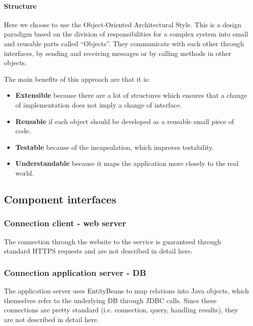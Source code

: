 \paragraph{Structure} Here we choose to use the Object-Oriented Architectural Style.
This is a design paradigm based on the division of responsibilities for a complex system
into small and reusable parts called ``Objects''.
They communicate with each other through interfaces, by sending and receiving messages
or by calling methods in other objects.

The main benefits of this approach are that it is:

\begin{itemize}
    \item{\textbf{Extensible} because there are a lot of structures which ensures that a change of implementation does not imply a change of interface.}
    \item{\textbf{Reusable} if each object should be developed as a reusable small piece of code.}
    \item{\textbf{Testable} because of the incapsulation, which improves testability.}
    \item{\textbf{Understandable} because it maps the application more closely to the real world.}
\end{itemize}

\subsection{Component interfaces}

\subsubsection{Connection client - web server} %
\label{ssub:https}
The connection through the website to the service is guaranteed through standard HTTPS requests and are not described in detail here.

\subsubsection{Connection application server - DB} %
\label{ssub:connection_application_server_db}
The application server uses EntityBeans to map relations into Java objects, which themselves refer to the underlying DB through JDBC calls. Since these connections are pretty standard (i.e. connection, query, handling results), they are not described in detail here.

